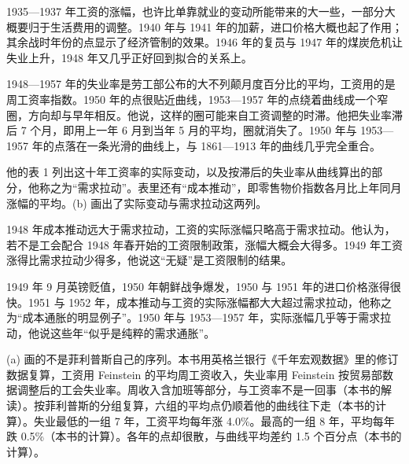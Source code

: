 1935—1937 年工资的涨幅，也许比单靠就业的变动所能带来的大一些，一部分大概要归于生活费用的调整\cite{phillips1958}。1940 年与 1941 年的加薪，进口价格大概也起了作用；其余战时年份的点显示了经济管制的效果\cite{phillips1958}。1946 年的复员与 1947 年的煤炭危机让失业上升，1948 年又几乎正好回到拟合的关系上\cite{phillips1958}。

1948—1957 年的失业率是劳工部公布的大不列颠月度百分比的平均，工资用的是周工资率指数\cite{phillips1958}。1950 年的点很贴近曲线，1953—1957 年的点绕着曲线成一个窄圈，方向却与早年相反\cite{phillips1958}。他说，这样的圈可能来自工资调整的时滞。他把失业率滞后 7 个月，即用上一年 6 月到当年 5 月的平均，圈就消失了\cite{phillips1958}。1950 年与 1953—1957 年的点落在一条光滑的曲线上，与 1861—1913 年的曲线几乎完全重合\cite{phillips1958}。

他的表 1 列出这十年工资率的实际变动，以及按滞后的失业率从曲线算出的部分，他称之为“需求拉动”\cite{phillips1958}。表里还有“成本推动”，即零售物价指数各月比上年同月涨幅的平均\cite{phillips1958}。(b) 画出了实际变动与需求拉动这两列。

1948 年成本推动远大于需求拉动，工资的实际涨幅只略高于需求拉动\cite{phillips1958}。他认为，若不是工会配合 1948 年春开始的工资限制政策，涨幅大概会大得多。1949 年工资涨得比需求拉动少得多，他说这“无疑”是工资限制的结果\cite{phillips1958}。

1949 年 9 月英镑贬值，1950 年朝鲜战争爆发，1950 与 1951 年的进口价格涨得很快\cite{phillips1958}。1951 与 1952 年，成本推动与工资的实际涨幅都大大超过需求拉动，他称之为“成本通胀的明显例子”\cite{phillips1958}。1950 年与 1953—1957 年，实际涨幅几乎等于需求拉动，他说这些年“似乎是纯粹的需求通胀”\cite{phillips1958}。

(a) 画的不是菲利普斯自己的序列。本书用英格兰银行《千年宏观数据》里的修订数据复算，工资用 Feinstein 的平均周工资收入，失业率用 Feinstein 按贸易部数据调整后的工会失业率\cite{boe2017}。周收入含加班等部分，与工资率不是一回事（本书的解读）。按菲利普斯的分组复算，六组的平均点仍顺着他的曲线往下走（本书的计算）。失业最低的一组 7 年，工资平均每年涨 4.0\%。最高的一组 8 年，平均每年跌 0.5\%（本书的计算）。各年的点却很散，与曲线平均差约 1.5 个百分点（本书的计算）。

